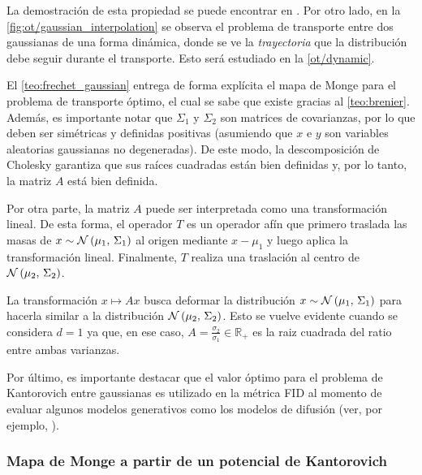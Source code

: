 
La demostración de esta propiedad se puede encontrar en \cite{peyré2020computational}. Por otro lado, en la \autoref{fig:ot/gaussian_interpolation} se observa el problema de transporte entre dos gaussianas de una forma dinámica, donde se ve la \textit{trayectoria} que la distribución debe seguir durante el transporte. Esto será estudiado en la \autoref{ot/dynamic}. 

El \autoref{teo:frechet_gaussian} entrega de forma explícita el mapa de Monge para el problema de transporte óptimo, el cual se sabe que existe gracias al \autoref{teo:brenier}. Además, es importante notar que $\Sigma_1$ y $\Sigma_2$ son matrices de covarianzas, por lo que deben ser simétricas y definidas positivas (asumiendo que $x$ e $y$ son variables aleatorias gaussianas no degeneradas). De este modo, la descomposición de Cholesky garantiza que sus raíces cuadradas están bien definidas y, por lo tanto, la matriz $A$ está bien definida.

Por otra parte, la matriz $A$ puede ser interpretada como una transformación lineal. De esta forma, el operador $T$ es un operador afín que primero traslada las masas de $x\sim \mathcal{N}\left(\mu_1,\,\Sigma_1\right)$ al origen mediante $x-\mu_1$ y luego aplica la transformación lineal. Finalmente, $T$ realiza una traslación al centro de $\mathcal{N}\left(\mu_2,\,\Sigma_2\right)$.

La transformación $x\mapsto Ax$ busca deformar la distribución $x\sim \mathcal{N}\left(\mu_1,\,\Sigma_1\right)$ para hacerla similar a la distribución $\mathcal{N}\left(\mu_2,\,\Sigma_2\right)$. Esto se vuelve evidente cuando se considera $d=1$ ya que, en ese caso, $A=\frac{\sigma_2}{\sigma_1} \in\mathbb{R}_+$ es la raiz cuadrada del ratio entre ambas varianzas.

Por último, es importante destacar que el valor óptimo para el problema de Kantorovich entre gaussianas es utilizado en la métrica FID al momento de evaluar algunos modelos generativos como los modelos de difusión (ver, por ejemplo, \cite{betzalel2022studyevaluationgenerativemodels}).

\subsubsection{Mapa de Monge a partir de un potencial de Kantorovich}

